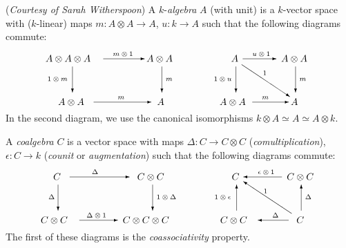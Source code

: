 \documentclass[12pt]{amsart}
\begin{document}
({\sl Courtesy of Sarah Witherspoon})
A $k$-{\em algebra} $A$ (with unit) is a $k$-vector space with
($k$-linear) maps $m:A\otimes A\rightarrow A$, 
$u:k\rightarrow A$ such that the following diagrams
commute:
$$
\begin{picture}(135,58)
\put(0,45){$A\otimes A\otimes A$}   \put(105,45){$A\otimes A$}
\put(13,0){$A\otimes A$}             \put(116,0){$A$}
\put(70,51){\scriptsize $m\otimes 1$}       
\put( 2,25){\scriptsize $1\otimes m$}
\put(75, 6){\scriptsize $m$}      \put(125,25){\scriptsize $m$}
\put(60,48){\vector(1,0){43}}   \put(50, 3){\vector(1,0){60}}
\put(28,40){\vector(0,-1){27}}  \put(121,40){\vector(0,-1){27}}
\end{picture}
\qquad\qquad
\begin{picture}(103,58)
\put(18,45){$A$}                 \put(70,45){$A\otimes A$}
\put(6,0){$A\otimes A$}        \put(80,0){$A$}
\put(40,51){\scriptsize $u\otimes 1$}       
\put( 0,25){\scriptsize $1\otimes u$}
\put(50, 6){\scriptsize$m$}     \put(89,25){\scriptsize$m$}
\put(30,48){\vector(1,0){35}}   \put(40, 3){\vector(1,0){38}}
\put(23,40){\vector(0,-1){27}}  \put(85,40){\vector(0,-1){27}}
\put(29,42){\vector(3,-2){50}} \put(51,31){\scriptsize $1$}
\end{picture}
$$
In the second diagram, we use the canonical isomorphisms 
$k\otimes A \simeq A\simeq A\otimes k$.

A {\em coalgebra} $C$ is a vector space with maps $\Delta:C\rightarrow 
C\otimes C$ ({\em comultiplication}), $\epsilon:C\rightarrow k$ ({\em counit}
or {\em augmentation}) such that the following diagrams commute:
$$
\begin{picture}(140,58)
\put(13,45){$C$}              \put(100,45){$C\otimes C$}
\put(0,0){$C\otimes C$}      \put(85, 0){$C\otimes C\otimes C$}
\put(53,51){\scriptsize $\Delta$}       \put( 8,25){\scriptsize $\Delta$}
\put(47.5, 6){\scriptsize $\Delta\otimes 1$}      
\put(120,25){\scriptsize $1\otimes\Delta$}
\put(30,48){\vector(1,0){62}}   \put(40, 3){\vector(1,0){40}}
\put(18,40){\vector(0,-1){27}}  \put(116,40){\vector(0,-1){27}}
\end{picture}
\qquad\qquad
\begin{picture}(107,58)
\put(18,45){$C$}                 \put(75,45){$C\otimes C$}
\put(6,0){$C\otimes C$}        \put(85,0){$C$}
\put(45,51){\scriptsize $\epsilon\otimes 1$}       
\put( 0,25){\scriptsize $1\otimes\epsilon$}
\put(60, 6){\scriptsize$\Delta$}     \put(94,25){\scriptsize$\Delta$}
\put(70,48){\vector(-1,0){40}}   \put(77, 3){\vector(-1,0){32}}
\put(23,13){\vector(0,1){27}}  \put(90,13){\vector(0,1){27}}
\put(80,10){\vector(-3,2){50}} \put(51,31){\scriptsize $1$}
\end{picture}
$$
The first of these diagrams is the {\em coassociativity} property.
\end{document}
